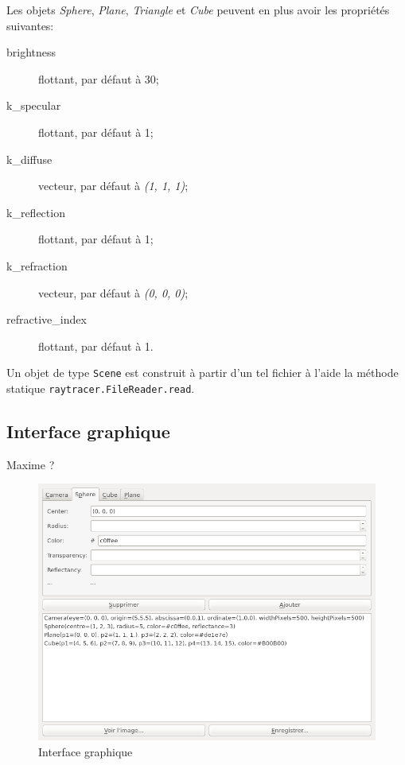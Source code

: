\documentclass[a4paper]{article}
\begin{document}
    \bigskip
    Les objets \textit{Sphere}, \textit{Plane}, \textit{Triangle} et
    \textit{Cube} peuvent en plus avoir les propriétés suivantes:
    \begin{description}
      \item[brightness] flottant, par défaut à 30;
      \item[k\_specular] flottant, par défaut à 1;
      \item[k\_diffuse] vecteur, par défaut à \textit{(1, 1, 1)};
      \item[k\_reflection] flottant, par défaut à 1;
      \item[k\_refraction] vecteur, par défaut à \textit{(0, 0, 0)};
      \item[refractive\_index] flottant, par défaut à 1.
    \end{description}

    \bigskip
    Un objet de type \verb+Scene+ est construit à partir d'un tel fichier à
    l'aide la méthode statique \verb+raytracer.FileReader.read+.

  \subsection{Interface graphique}
    Maxime ?

    \begin{figure}[p]
      \centerline{\includegraphics[width=1.2\textwidth]{gui.png}}
    \caption{Interface graphique\label{fig:gui}}
    \end{figure}
\end{document}
